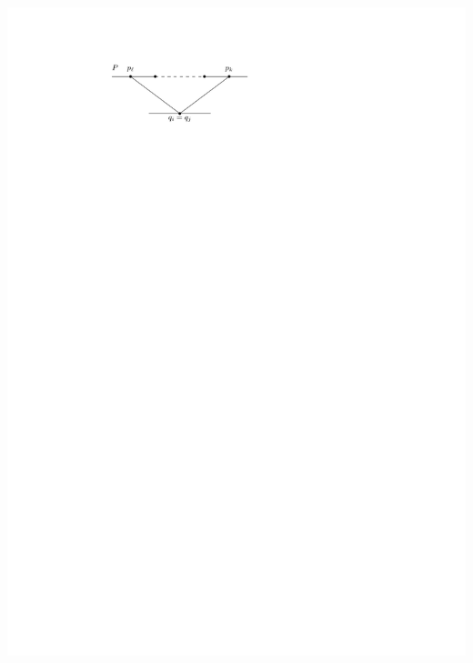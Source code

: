 \documentclass[a4paper]{article}
\begin{document}
\includegraphics[scale=1]{./unifiedAlgo/img/rightNeighbourwalk/neighborPathisPath.pdf}
\clearpage%
\end{document}
